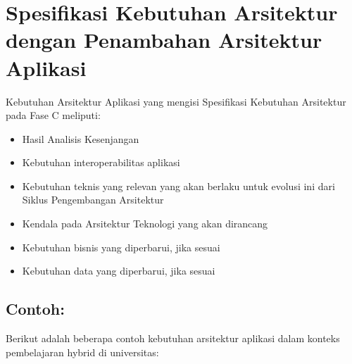 \section{Spesifikasi Kebutuhan Arsitektur dengan Penambahan Arsitektur Aplikasi}
\label{sec:spesifikasi_kebutuhan_arsitektur_aplikasi}

Kebutuhan Arsitektur Aplikasi yang mengisi Spesifikasi Kebutuhan Arsitektur pada Fase C meliputi:

\begin{itemize}
	\item Hasil Analisis Kesenjangan
	\item Kebutuhan interoperabilitas aplikasi
	\item Kebutuhan teknis yang relevan yang akan berlaku untuk evolusi ini dari Siklus Pengembangan Arsitektur
	\item Kendala pada Arsitektur Teknologi yang akan dirancang
	\item Kebutuhan bisnis yang diperbarui, jika sesuai
	\item Kebutuhan data yang diperbarui, jika sesuai
\end{itemize}

\subsection*{Contoh:}

Berikut adalah beberapa contoh kebutuhan arsitektur aplikasi dalam konteks pembelajaran hybrid di universitas:

